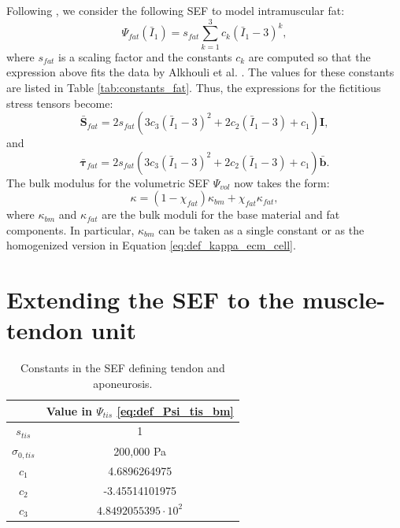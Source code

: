 \documentclass{sfuthesis}
\numberwithin{equation}{section}
\numberwithin{figure}{chapter}
\numberwithin{table}{chapter}
\theoremstyle{definition}
\def\*#1{{\mathbf{#1}}} %
\newcommand{\I}{{\bar{I}}}
\def\btau{{\bm{\tau}}}
\begin{document}
Following \cite{KonnoEtAl2022_CP}, we consider the following SEF to model intramuscular fat:
\begin{equation} \label{eq:def_Psi_fat}
    \Psi_{fat}(\I_1) = s_{fat} \sum_{k=1}^3 c_k (\I_1 - 3)^k,
\end{equation}
where $s_{fat}$ is a scaling factor and the constants $c_k$ are computed so that the expression above fits the data by Alkhouli et al. \cite{Alkhouli2013}. The values for these constants are listed in Table \ref{tab:constants_fat}. Thus, the expressions for the fictitious stress tensors become:
\begin{equation}
    \bar{\*S}_{fat} = 2s_{fat} \left( 3c_3(\I_1-3)^2 + 2c_2 (\I_1-3) + c_1 \right) \*I, 
\end{equation}
and
\begin{equation}
    \bar{\btau}_{fat} = 2s_{fat} \left( 3c_3(\I_1-3)^2 + 2c_2 (\I_1-3) + c_1 \right) \bar{\*b}.
\end{equation}
The bulk modulus for the volumetric SEF $\Psi_{vol}$ now takes the form:
\begin{equation} \label{eq:def_kappa_bm_fat}
    \kappa = (1-\chi_{fat}) \kappa_{bm} + \chi_{fat} \kappa_{fat},
\end{equation}
where $\kappa_{bm}$ and $\kappa_{fat}$ are the bulk moduli for the base material and fat components. In particular, $\kappa_{bm}$ can be taken as a single constant or as the homogenized version in Equation \eqref{eq:def_kappa_ecm_cell}.

\section{Extending the SEF to the muscle-tendon unit} \label{sec:extension_sef_mtu}

\begin{table}
    \centering
    \begin{tabular}{|c|c|}\hline
        & Value in $\Psi_{tis}$ \eqref{eq:def_Psi_tis_bm} \\\hline
        $s_{tis}$ & 1 \\\hline
        $\sigma_{0,tis}$ & 200,000 \si{Pa} \\\hline
        $c_1$ & 4.6896264975 \\\hline
        $c_2$ & -3.45514101975 \\\hline
        $c_3$ & $4.8492055395 \cdot 10^2$ \\\hline
    \end{tabular}
    \caption{Constants in the SEF defining tendon and aponeurosis. \label{tab:constants_ten_apo}}
\end{table}
\end{document}
